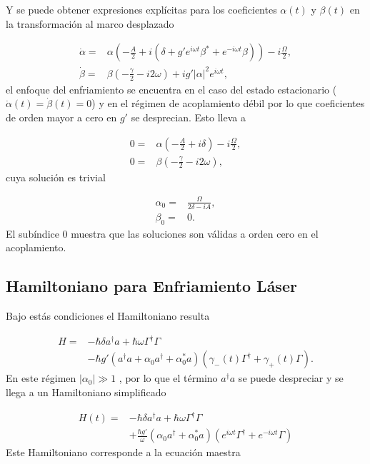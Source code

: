 \documentclass[10pt,a4paper]{report}
\begin{document}
Y se puede obtener expresiones explícitas para los coeficientes $\alpha(t)$ y $\beta(t)$ en la transformación al marco desplazado

\begin{align}
\dot{\alpha} =& \alpha(-\frac{A}{2}+i(\delta+g'e^{i\omega t} \beta^* + e^{-i\omega t} \beta))-i\frac{\Omega}{2},\\
\dot{\beta} =& \beta(-\frac{\gamma}{2}-i 2\omega)+ig'|\alpha|^2e^{i\omega t},
\end{align} el enfoque del enfriamiento se encuentra en el caso del estado estacionario ($\dot{\alpha}(t)=\dot{\beta}(t)=0$) y en el régimen de acoplamiento débil por lo que coeficientes de orden mayor a cero en  $g'$ se desprecian. Esto lleva a 

\begin{align}
0 =& \alpha(-\frac{A}{2}+i\delta)-i\frac{\Omega}{2},\\
0 =& \beta(-\frac{\gamma}{2}-i 2\omega),
\end{align} cuya solución es trivial 

\begin{align}
\alpha_0 =& \frac{\Omega}{2\delta-iA},\\
\beta_0 =& 0.
\end{align} El subíndice 0 muestra que las soluciones son válidas a orden cero en el acoplamiento.

\subsection{Hamiltoniano para Enfriamiento Láser}

Bajo estás condiciones  el Hamiltoniano resulta

\begin{align}
H =& -\hbar \delta a^{\dagger}a +\hbar\omega\Gamma^{\dagger}\Gamma \\
&-\hbar g'(a^{\dagger}a +\alpha_0 a^{\dagger}+\alpha^*_0 a)(\gamma_-(t)\Gamma^{\dagger}+\gamma_+(t)\Gamma)\nonumber.
\end{align} En este régimen $|\alpha_0| \gg 1$ \cite{BarberisLC}, por lo que el término $a^\dagger a$ se puede despreciar y se llega a un Hamiltoniano simplificado

\begin{align} \label{LCHamiltonian}
H(t) =& -\hbar \delta a^{\dagger}a +\hbar\omega\Gamma^{\dagger}\Gamma \\
&+\frac{\hbar g'}{\omega}(\alpha_0 a^{\dagger}+\alpha^*_0 a)(e^{i\omega t} \nonumber\Gamma^{\dagger}+e^{-i\omega t}\Gamma)
\end{align} Este Hamiltoniano corresponde a la ecuación maestra
\end{document}
